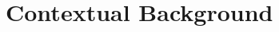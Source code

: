 \documentclass[ %
                    author={Luke Murray},
                supervisor={Dr. Simon Hollis},
                     title={Shadow Peer-to-Peer Networks},
                  subtitle={},
                    degree={MEng},
                      year={2013} ]{thesis}
\begin{document}

%

\mainmatter


\chapter{Contextual Background}
\label{chap:context}
\end{document}
